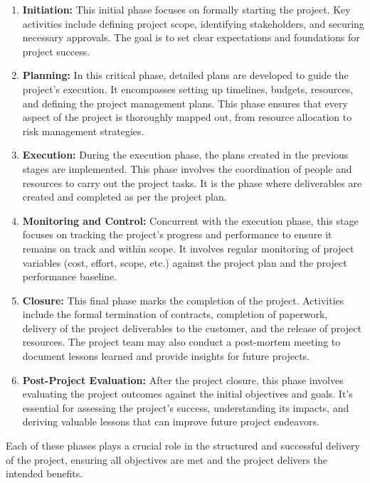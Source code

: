 \begin{enumerate}
    \item \textbf{Initiation:} This initial phase focuses on formally starting the project. Key activities include defining project scope, identifying stakeholders, and securing necessary approvals. The goal is to set clear expectations and foundations for project success.

    \item \textbf{Planning:} In this critical phase, detailed plans are developed to guide the project's execution. It encompasses setting up timelines, budgets, resources, and defining the project management plans. This phase ensures that every aspect of the project is thoroughly mapped out, from resource allocation to risk management strategies.

    \item \textbf{Execution:} During the execution phase, the plans created in the previous stages are implemented. This phase involves the coordination of people and resources to carry out the project tasks. It is the phase where deliverables are created and completed as per the project plan.

    \item \textbf{Monitoring and Control:} Concurrent with the execution phase, this stage focuses on tracking the project's progress and performance to ensure it remains on track and within scope. It involves regular monitoring of project variables (cost, effort, scope, etc.) against the project plan and the project performance baseline.

    \item \textbf{Closure:} This final phase marks the completion of the project. Activities include the formal termination of contracts, completion of paperwork, delivery of the project deliverables to the customer, and the release of project resources. The project team may also conduct a post-mortem meeting to document lessons learned and provide insights for future projects.

    \item \textbf{Post-Project Evaluation:} After the project closure, this phase involves evaluating the project outcomes against the initial objectives and goals. It's essential for assessing the project's success, understanding its impacts, and deriving valuable lessons that can improve future project endeavors.
\end{enumerate}

Each of these phases plays a crucial role in the structured and successful delivery of the project, ensuring all objectives are met and the project delivers the intended benefits.


